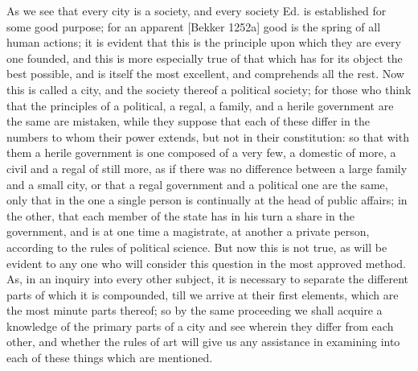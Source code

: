 As we see that every city is a society, and every society Ed. is
established for some good purpose; for an apparent [Bekker 1252a] good is
the spring of all human actions; it is evident that this is the principle
upon which they are every one founded, and this is more especially true of
that which has for its object the best possible, and is itself the most
excellent, and comprehends all the rest. Now this is called a city, and
the society thereof a political society; for those who think that the
principles of a political, a regal, a family, and a herile government are
the same are mistaken, while they suppose that each of these differ in the
numbers to whom their power extends, but not in their constitution: so
that with them a herile government is one composed of a very few, a
domestic of more, a civil and a regal of still more, as if there was no
difference between a large family and a small city, or that a regal
government and a political one are the same, only that in the one a single
person is continually at the head of public affairs; in the other, that
each member of the state has in his turn a share in the government, and is
at one time a magistrate, at another a private person, according to the
rules of political science. But now this is not true, as will be evident
to any one who will consider this question in the most approved method.
As, in an inquiry into every other subject, it is necessary to separate
the different parts of which it is compounded, till we arrive at their
first elements, which are the most minute parts thereof; so by the same
proceeding we shall acquire a knowledge of the primary parts of a city and
see wherein they differ from each other, and whether the rules of art will
give us any assistance in examining into each of these things which are
mentioned.


